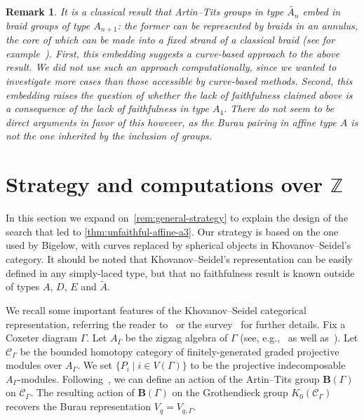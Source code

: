 \documentclass[a4paper]{amsart}
\newcommand{\Z}{\mathbb{Z}}
\newcommand{\0}{\mathbf{0}}
\renewcommand{\tilde}{\widetilde}
\theoremstyle{theorem}
\newtheorem{remark}[theorem]{Remark}
\begin{document}
\begin{remark}
  It is a classical result that Artin--Tits groups in type $\tilde{A_n}$ embed in braid groups of type $A_{n+1}$: the former can be represented by braids in an annulus, the core of which can be made into a fixed strand of a classical braid (see for example~\cite{Allcock}).
  First, this embedding suggests a curve-based approach to the above result.
  We did not use such an approach computationally, since we wanted to investigate more cases than those accessible by curve-based methods.
  Second, this embedding raises the question of whether the lack of faithfulness claimed above is a consequence of the lack of faithfulness in type $A_4$. There do not seem to be direct arguments in favor of this however, as the Burau pairing in affine type $A$ is not the one inherited by the inclusion of groups.
\end{remark}

\section{Strategy and computations over $\Z$} \label{sec:strategyZ}

In this section we expand on~\cref{rem:general-strategy} to explain the design of the search that led to \cref{thm:unfaithful-affine-a3}.
Our strategy is based on the one used by Bigelow, with curves replaced by spherical objects in Khovanov--Seidel's category.
It should be noted that Khovanov--Seidel's representation can be easily defined in any simply-laced type, but that no faithfulness result is known outside of types $A$, $D$, $E$ and $\tilde{A}$.

We recall some important features of the Khovanov--Seidel categorical representation, referring the reader to~\cite{KhS} or the survey~\cite{Queffelec_KhS} for further details.
Fix a Coxeter diagram \(\Gamma\).
Let \(A_{\Gamma}\) be the zigzag algebra of \(\Gamma\) (see, e.g.,~\cite[Section 5]{hue.kho:01} as well as~\cite[Remark 6.6]{BDL}).
Let \(\mathcal{C}_{\Gamma}\) be the bounded homotopy category of finitely-generated graded projective modules over \(A_{\Gamma}\).
We set \(\{P_i \mid i \in V(\Gamma)\}\) to be the projective indecomposable \(A_{\Gamma}\)-modules.
Following~\cite{KhS}, we can define an action of the Artin--Tits group \(\mathbf{B}(\Gamma)\) on \(\mathcal{C}_{\Gamma}\).
The resulting action of \(\mathbf{B}(\Gamma)\) on the Grothendieck group \(K_0(\mathcal{C}_{\Gamma})\) recovers the Burau representation \(V_q = V_{q, \Gamma}\).
\end{document}

